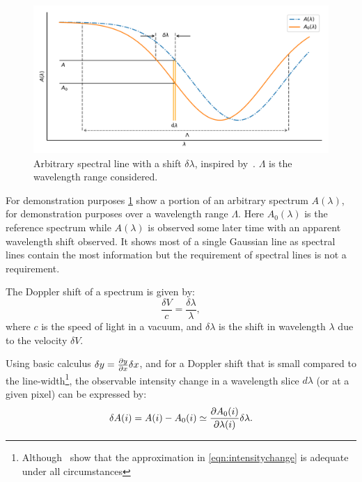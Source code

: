 \begin{figure}
    \centering
    \includegraphics[width=0.7\linewidth]{figures/information-content/precision_plot.pdf}
    \caption[Demonstration of a shifted arbitrary spectral line.]{Arbitrary spectral line with a shift \(\delta \lambda\), inspired by~\citet{connes_absolute_1985}.  \(\Lambda\) is the wavelength range considered.}
    \label{fig:precisionderivation}
\end{figure}

For demonstration purposes  \cref{fig:precisionderivation} show a portion of an arbitrary spectrum \(A(\lambda)\), for demonstration purposes over a wavelength range \(\Lambda\).
Here \(A_0(\lambda)\) is the reference spectrum while \(A(\lambda)\) is observed some later time with an apparent wavelength shift observed.
It shows most of a single Gaussian line as spectral lines contain the most information but the requirement of spectral lines is not a requirement.

The Doppler shift of a spectrum is given by:
\begin{equation}
\frac{\delta V}{c} = \frac{\delta \lambda}{\lambda},
\label{eqn:dopplershift}
\end{equation}
where \(c\) is the speed of light in a vacuum, and \(\delta \lambda\) is the shift in wavelength \(\lambda\) due to the velocity \(\delta V\).


Using basic calculus \(\delta y = \frac{\partial{y}}{\partial{x}} \delta x \nonumber\), and for a Doppler shift that is small compared to the line-width\footnote{Although~\citet{connes_absolute_1985} show that the approximation in \cref{eqn:intensitychange} is adequate under all circumstances}, the observable intensity change in a wavelength slice \(d \lambda\) (or at a given pixel) can be expressed by:
\begin{equation}
\delta A(i) = A(i) - A_0(i) \simeq \frac{\partial{A_0(i)}}{\partial{\lambda(i)}} \delta \lambda.
\label{eqn:intensitychange}
\end{equation}

